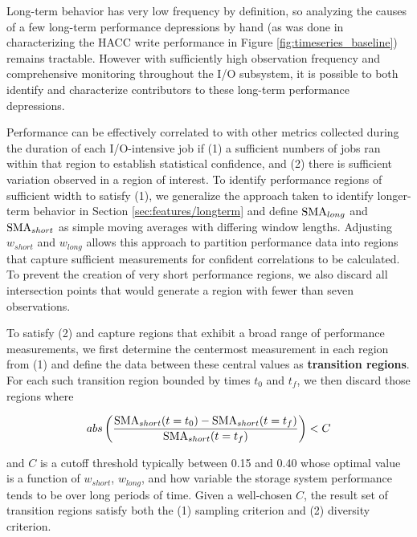 Long-term behavior has very low frequency by definition, so analyzing the causes of a few long-term performance depressions by hand (as was done in characterizing the HACC write performance in Figure \ref{fig:timeseries_baseline}) remains tractable.
However with sufficiently high observation frequency and comprehensive monitoring throughout the I/O subsystem, it is possible to both identify and characterize contributors to these long-term performance depressions.

Performance can be effectively correlated to with other metrics collected during the duration of each I/O-intensive job if (1) a sufficient numbers of jobs ran within that region to establish statistical confidence, and (2) there is sufficient variation observed in a region of interest.
To identify performance regions of sufficient width to satisfy (1), we generalize the approach taken to identify longer-term behavior in Section \ref{sec:features/longterm} and define $\textup{SMA}_{long}$ and $\textup{SMA}_{short}$ as simple moving averages with differing window lengths.
Adjusting $w_{short}$ and $w_{long}$ allows this approach to partition performance data into regions that capture sufficient measurements for confident correlations to be calculated.
To prevent the creation of very short performance regions, we also discard all intersection points that would generate a region with fewer than seven observations.

To satisfy (2) and capture regions that exhibit a broad range of performance measurements, we first determine the centermost measurement in each region from (1) and define the data between these central values as \textbf{transition regions}.
For each such transition region bounded by times $t_0$ and $t_f$, we then discard those regions where

\begin{equation}
abs \left (
\frac
	{ \textup{SMA}_{short}(t=t_0) - \textup{SMA}_{short}(t=t_f) }
	{\textup{SMA}_{short}(t=t_f)}
\right ) < C
\end{equation}

and $C$ is a cutoff threshold typically between 0.15 and 0.40 whose optimal value is a function of $w_{short}$, $w_{long}$, and how variable the storage system performance tends to be over long periods of time.  Given a well-chosen $C$, the result set of transition regions satisfy both the (1) sampling criterion and (2) diversity criterion.

